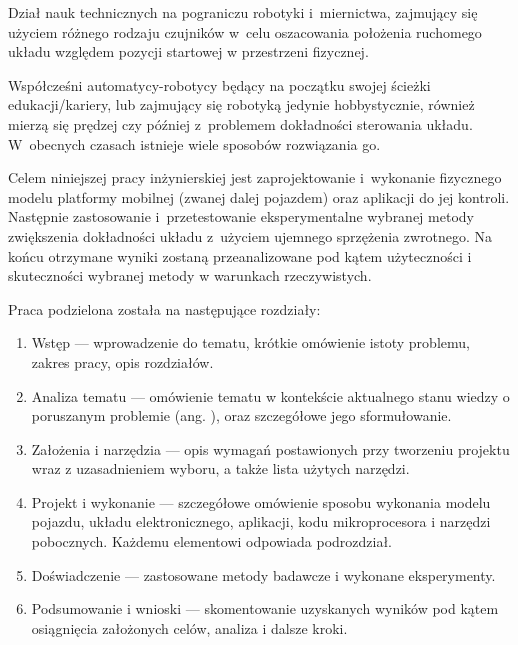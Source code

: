 \begin{Definition}[Odometria]\label{def:odometria}
    Dział nauk technicznych na pograniczu robotyki i~miernictwa, zajmujący się użyciem różnego rodzaju czujników w~celu oszacowania położenia ruchomego układu względem pozycji startowej w przestrzeni fizycznej.
\end{Definition}

Współcześni automatycy-robotycy będący na początku swojej ścieżki edukacji/kariery, lub zajmujący się robotyką jedynie hobbystycznie, również mierzą się prędzej czy później z~problemem dokładności sterowania układu. W~obecnych czasach istnieje wiele sposobów rozwiązania go.

Celem niniejszej pracy inżynierskiej jest zaprojektowanie i~wykonanie fizycznego modelu platformy mobilnej (zwanej dalej pojazdem) oraz aplikacji do jej kontroli. Następnie zastosowanie i~przetestowanie eksperymentalne wybranej metody zwiększenia dokładności układu z~użyciem ujemnego sprzężenia zwrotnego. Na końcu otrzymane wyniki zostaną przeanalizowane pod kątem użyteczności i skuteczności wybranej metody w warunkach rzeczywistych.

Praca podzielona została na następujące rozdziały\cite{bib:wymaganiapracy}:
\begin{enumerate}
    \item Wstęp --- wprowadzenie do tematu, krótkie omówienie istoty problemu, zakres pracy, opis rozdziałów.
    \item Analiza tematu --- omówienie tematu w kontekście aktualnego stanu wiedzy o poruszanym problemie (ang. ), oraz szczegółowe jego sformułowanie.
    \item Założenia i narzędzia --- opis wymagań postawionych przy tworzeniu projektu wraz z uzasadnieniem wyboru, a także lista użytych narzędzi.
    \item Projekt i wykonanie --- szczegółowe omówienie sposobu wykonania modelu pojazdu, układu elektronicznego, aplikacji, kodu mikroprocesora i narzędzi pobocznych. Każdemu elementowi odpowiada podrozdział.
    \item Doświadczenie --- zastosowane metody badawcze i wykonane eksperymenty.
    \item Podsumowanie i wnioski --- skomentowanie uzyskanych wyników pod kątem osiągnięcia założonych celów, analiza i dalsze kroki.
\end{enumerate}
